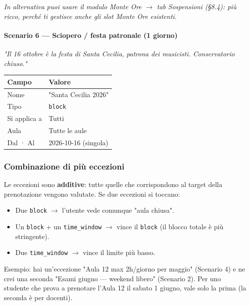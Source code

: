 \documentclass[11pt,a4paper]{article}
\renewenvironment{quote}
  {\begin{list}{}{%
      \setlength{\leftmargin}{8pt}%
      \setlength{\rightmargin}{8pt}%
      \setlength{\topsep}{6pt}%
      \setlength{\parsep}{0pt}}%
      \item\relax\color{black!75}\itshape}
  {\end{list}}
\begin{document}
\begin{quote}
In alternativa puoi usare il modulo Monte Ore $\rightarrow$ tab Sospensioni (§8.4): più ricco, perché ti gestisce anche gli slot Monte Ore esistenti.
\end{quote}

\paragraph{Scenario 6 --- Sciopero / festa patronale (1 giorno)}


\begin{quote}
\textit{"Il 16 ottobre è la festa di Santa Cecilia, patrona dei musicisti. Conservatorio chiuso."}
\end{quote}

\begin{table}[H]
\centering
\small
\begin{tabularx}{\linewidth}{|X|X|}
\hline
\rowcolor{tableheader} Campo & Valore \\
\hline
Nome & "Santa Cecilia 2026" \\
\hline
Tipo & \texttt{block} \\
\hline
Si applica a & Tutti \\
\hline
Aula & Tutte le aule \\
\hline
Dal · Al & 2026-10-16 (singola) \\
\hline
\end{tabularx}
\end{table}


\subsubsection{Combinazione di più eccezioni}


Le eccezioni sono \textbf{additive}: tutte quelle che corrispondono al target della prenotazione vengono valutate. Se due eccezioni si toccano:

\begin{itemize}
  \item Due \texttt{block} $\rightarrow$ l'utente vede comunque "aula chiusa".
  \item Un \texttt{block} + un \texttt{time\_window} $\rightarrow$ vince il \texttt{block} (il blocco totale è più stringente).
  \item Due \texttt{time\_window} $\rightarrow$ vince il limite più basso.
\end{itemize}

Esempio: hai un'eccezione "Aula 12 max 2h/giorno per maggio" (Scenario 4) e ne crei una seconda "Esami giugno --- weekend libero" (Scenario 2). Per uno studente che prova a prenotare l'Aula 12 il sabato 1 giugno, vale solo la prima (la seconda è per docenti).
\end{document}
